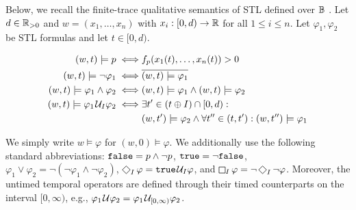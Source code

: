Below, we recall the finite-trace qualitative semantics of STL defined over $\mathbb{B}$ \cite{MalerN13}.
Let $d \in \mathbb{R}_{> 0}$ and $w = (x_1, \ldots, x_n)$ with $x_i : [0,d) \to \mathbb{R}$ for all $1 \leq i \leq n$.
Let $\varphi_1, \varphi_2$ be STL formulas and let $t \in [0,d)$.

\small
\begin{align*}
	(w,t) \models p \iff & f_p(x_1(t), \ldots, x_n(t)) > 0 \\
	(w,t) \models \lnot \varphi_1 \iff & \overline{(w,t) \models \varphi_1} \\
	(w,t) \models \varphi_1 \land \varphi_2 \iff & (w,t) \models \varphi_1 \land (w,t) \models \varphi_2 \\
	(w,t) \models \varphi_1 \kern.1em\mathcal{U}_I \varphi_2 \iff & \exists t' \in (t \oplus I) \cap [0,d) :  \\
	& (w,t') \models \varphi_2 \land \forall t'' \in (t, t') : (w,t'') \models \varphi_1
\end{align*}
\normalsize

We simply write $w \models \varphi$ for $(w,0) \models \varphi$.
We additionally use the following standard abbreviations: 
$\texttt{false} = p \land \lnot p$,
$\texttt{true} = \lnot \texttt{false}$,
$ \varphi_1 \lor \varphi_2 = \lnot (\lnot \varphi_1 \land \lnot \varphi_2)$,
$\LTLf_I \varphi = \true \until_I \varphi$, and
$\LTLg_I \varphi = \lnot \LTLf_I \lnot \varphi$.
Moreover, the untimed temporal operators are defined through their timed counterparts on the interval $[0,\infty)$, e.g., $\varphi_1 \kern.1em\mathcal{U} \varphi_2 = \varphi_1 \kern.1em\mathcal{U}_{[0,\infty)} \varphi_2$.



